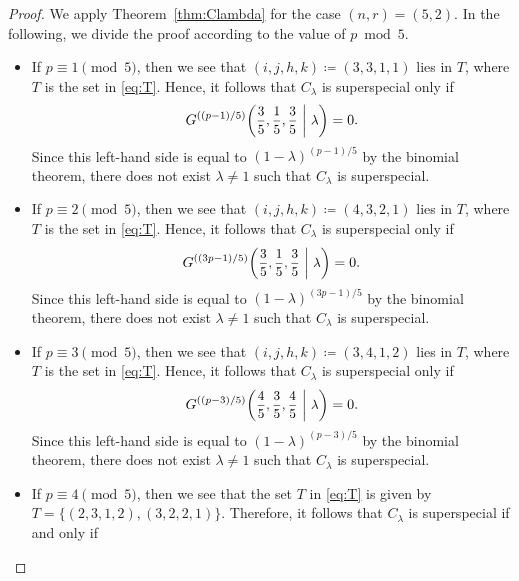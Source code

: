 \documentclass[10pt,a4paper]{amsart}
\begin{document}
\begin{proof}
We apply \hspace{-0.1mm}Theorem~\ref{thm:Clambda} for the case $(n,r) = (5,2)$.
In the following, we divide the proof according to the value of $p \bmod{5}$.\vspace{-1.1mm}
\begin{itemize}
\item If $p \equiv 1 \pmod{5}$, then we see that $(i,j,h,k) \coloneqq (3,3,1,1)$ lies in $T$, where $T$ is the set in \eqref{eq:T}.
Hence, it follows that $C_\lambda$ is superspecial only if\vspace{-1.5mm}
\[
    G^{((p-1)/5)}\scalebox{0.95}{$\displaystyle\left(\frac{3}{5},\frac{1}{5},\frac{3}{5}\ \middle|\ \lambda\right)$} = 0.\vspace{-0.6mm}
\]
Since this left-hand side is equal to $(1-\lambda)^{(p-1)/5}$ by the binomial theorem, there does not exist $\lambda \neq 1$ such that $C_\lambda$ is superspecial.\vspace{-1.5mm}
\item If $p \equiv 2 \pmod{5}$, then we see that $(i,j,h,k) \coloneqq (4,3,2,1)$ lies in $T$, where $T$ is the set in \eqref{eq:T}.
Hence, it follows that $C_\lambda$ is superspecial only if\vspace{-1.5mm}
\[
    G^{((3p-1)/5)}\scalebox{0.95}{$\displaystyle\left(\frac{3}{5},\frac{1}{5},\frac{3}{5}\ \middle|\ \lambda\right)$} = 0.\vspace{-0.6mm}
\]
Since this left-hand side is equal to $(1-\lambda)^{(3p-1)/5}$ by the binomial theorem, there does not exist $\lambda \neq 1$ such that $C_\lambda$ is superspecial.\vspace{-1.5mm}
\item If $p \equiv 3 \pmod{5}$, then we see that $(i,j,h,k) \coloneqq (3,4,1,2)$ lies in $T$, where $T$ is the set in \eqref{eq:T}.
Hence, it follows that $C_\lambda$ is superspecial only if\vspace{-1.5mm}
\[
    G^{((p-3)/5)}\scalebox{0.95}{$\displaystyle\left(\frac{4}{5},\frac{3}{5},\frac{4}{5}\ \middle|\ \lambda\right)$} = 0.\vspace{-0.6mm}
\]
Since this left-hand side is equal to $(1-\lambda)^{(p-3)/5}$ by the binomial theorem, there does not exist $\lambda \neq 1$ such that $C_\lambda$ is superspecial.\vspace{-1.5mm}
\item If $p \equiv 4 \pmod{5}$, then we see that the set $T$ in \eqref{eq:T} is given by $T = \{(2,3,1,2),(3,2,2,1)\}$.
Therefore, it follows that $C_\lambda$ is superspecial if and only if\vspace{-1mm}

\end{itemize}
\end{proof}
\end{document}
